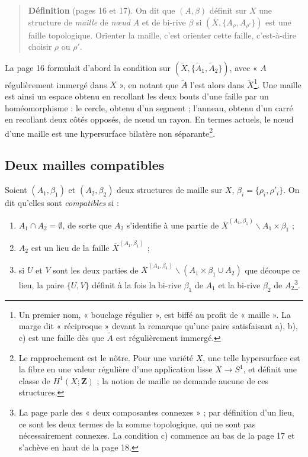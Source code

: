 \documentclass[11pt,a4paper]{article}
\begin{document}
\begin{quote}
\textbf{Définition} (pages 16 et 17). On dit que $(A, \beta)$ définit sur $X$ une
structure de \emph{maille} de \emph{nœud} $A$ et de bi-rive $\beta$ si
$(\overline{X}, \{A_{\rho}, A_{\rho'}\})$ est une faille topologique. Orienter la
maille, c'est orienter cette faille, c'est-à-dire choisir $\rho$ ou $\rho'$.
\end{quote}

La page 16 formulait d'abord la condition sur $(\widetilde{X}, \{\widetilde{A}_{1},
\widetilde{A}_{2}\})$, avec « $A$ régulièrement immergé dans $X$ », en notant que
$\widetilde{A}$ l'est alors dans $\widetilde{X}$\footnote{Un premier nom, « bouclage
régulier », est biffé au profit de « maille ». La marge dit « réciproque » devant la
remarque qu'une paire satisfaisant a), b), c) est une faille dès que
$\widetilde{A}$ est régulièrement immergé.}. Une maille est ainsi un espace obtenu
en recollant les deux bouts d'une faille par un homéomorphisme : le cercle, obtenu
d'un segment ; l'anneau, obtenu d'un carré en recollant deux côtés opposés, de
nœud un rayon. En termes actuels, le nœud d'une maille est une hypersurface
bilatère non séparante\footnote{Le rapprochement est le nôtre. Pour une variété
$X$, une telle hypersurface est la fibre en une valeur régulière d'une application lisse
$X \to S^{1}$, et définit une classe de $H^{1}(X; \mathbf{Z})$ ; la notion de
maille ne demande aucune de ces structures.}.

\subsection*{Deux mailles compatibles}

Soient $(A_{1}, \beta_{1})$ et $(A_{2}, \beta_{2})$ deux structures de maille sur
$X$, $\beta_{i} = \{\rho_{i}, \rho'_{i}\}$. On dit qu'elles sont \emph{compatibles}
si :
\begin{enumerate}
\item[a)] $A_{1} \cap A_{2} = \emptyset$, de sorte que $A_{2}$ s'identifie à une
partie de $\overline{X}^{(A_{1}, \beta_{1})} \smallsetminus A_{1} \times
\beta_{1}$ ;
\item[b)] $A_{2}$ est un lieu de la faille $\overline{X}^{(A_{1}, \beta_{1})}$ ;
\item[c)] si $U$ et $V$ sont les deux parties de $\overline{X}^{(A_{1},\beta_{1})}
\smallsetminus (A_{1} \times \beta_{1} \cup A_{2})$ que découpe ce lieu, la paire
$\{U, V\}$ définit à la fois la bi-rive $\beta_{1}$ de $A_{1}$ et la bi-rive
$\beta_{2}$ de $A_{2}$\footnote{La page parle des « deux composantes connexes » ; par
définition d'un lieu, ce sont les deux termes de la somme topologique, qui ne sont
pas nécessairement connexes. La condition c) commence au bas de la page 17 et
s'achève en haut de la page 18.}.
\end{enumerate}
\end{document}
